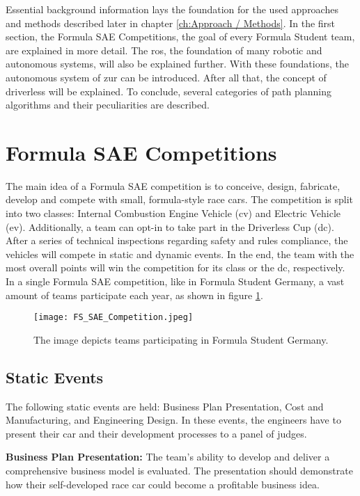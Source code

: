 Essential background information lays the foundation for the used approaches and methods described later in chapter \ref{ch:Approach / Methods}. In the first section, the Formula SAE Competitions, the goal of every Formula Student team, are explained in more detail. The \acrlong{ros}, the foundation of many robotic and autonomous systems, will also be explained further. With these foundations, the autonomous system of \acrlong{zur} can be introduced. After all that, the concept of driverless will be explained. To conclude, several categories of path planning algorithms and their peculiarities are described.

\section{Formula SAE Competitions} \label{sec:Formula SAE Competitions}
The main idea of a Formula SAE competition is to conceive, design, fabricate, develop and compete with small, formula-style race cars.
The competition is split into two classes: Internal Combustion Engine Vehicle (\acrshort{cv}) and Electric Vehicle (\acrshort{ev}).
Additionally, a team can opt-in to take part in the Driverless Cup (\acrshort{dc}).
After a series of technical inspections regarding safety and rules compliance, the vehicles will compete in static and dynamic events. In the end, the team with the most overall points will win the competition for its class or the \acrlong{dc}, respectively. \cite{fs_rules_2022_handbook}
In a single Formula SAE competition, like in Formula Student Germany, a vast amount of teams participate each year, as shown in figure \ref{fig:FS SAE Competition}.
\begin{figure}[H]
    \centering
    \texttt{[image: FS\_SAE\_Competition.jpeg]}
    \caption{The image depicts teams participating in Formula Student Germany. \cite{fs_germany}}
    \label{fig:FS SAE Competition}
\end{figure}

\subsection{Static Events} \label{sec:Static Events}
The following static events are held: Business Plan Presentation, Cost and Manufacturing, and Engineering Design. In these events, the engineers have to present their car and their development processes to a panel of judges. \cite{fs_rules_2022_handbook}

\textbf{Business Plan Presentation:} The team's ability to develop and deliver a comprehensive business model is evaluated. The presentation should demonstrate how their self-developed race car could become a profitable business idea.

